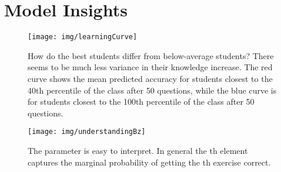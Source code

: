 \documentclass{article} \usepackage{nips,times}
\begin{document}
\section{Model Insights}

\begin{figure}[h]
\centering
\texttt{[image: img/learningCurve]}
\caption{How do the best students differ from below-average students? There seems to be much less variance in their knowledge increase. The red curve shows the mean predicted accuracy for students closest to the 40th percentile of the class after 50 questions, while the blue curve is for students closest to the 100th percentile of the class after 50 questions.
\label{fig:learningCurve}
}
\end{figure}

\begin{figure}[h]
\centering
\texttt{[image: img/understandingBz]}
\caption{The parameter  is easy to interpret. In general the th element captures the marginal probability of getting the th exercise correct.
\label{fig:understandingB}
}
\end{figure}
\end{document}
